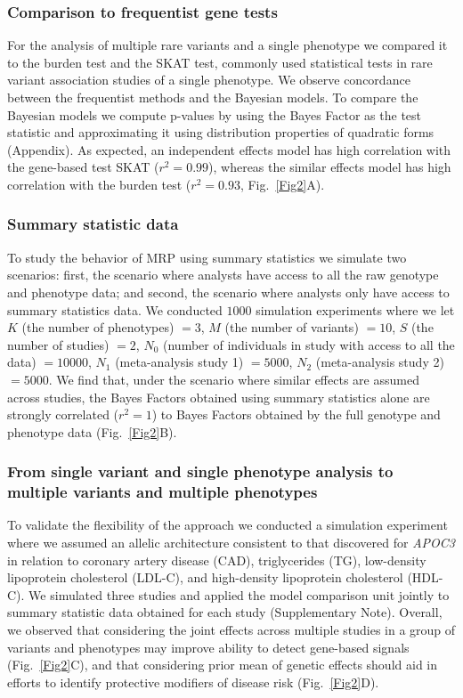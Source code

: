 \documentclass{nature}
\begin{document}
\subsubsection{Comparison to frequentist gene tests}
For the analysis of multiple rare variants and a single phenotype we compared it to the burden test and the SKAT test, commonly used statistical tests in rare variant association studies of a single phenotype. We observe concordance between the frequentist methods and the Bayesian models. To compare the Bayesian models we compute p-values by using the Bayes Factor as the test statistic and approximating it using distribution properties of quadratic forms (Appendix). As expected, an independent effects model has high correlation with the gene-based test SKAT ($r^2 = 0.99$), whereas the similar effects model has high correlation with the burden test ($r^2 = 0.93$, Fig.~\ref{Fig2}A). 

\subsubsection{Summary statistic data}
To study the behavior of MRP using summary statistics we simulate two scenarios: first, the scenario where analysts have access to all the raw genotype and phenotype data; and second, the scenario where analysts only have access to summary statistics data\cite{liu2014meta}. We conducted $1000$ simulation experiments where we let $K$ (the number of phenotypes) $=3$, $M$ (the number of variants) $=10$, $S$ (the number of studies) $=2$, $N_0$ (number of individuals in study with access to all the data) $= 10000$, $N_1$ (meta-analysis study 1) $= 5000$, $N_2$ (meta-analysis study 2) $= 5000$. We find that, under the scenario where similar effects are assumed across studies, the Bayes Factors obtained using summary statistics alone are strongly correlated ($r^2 = 1$) to Bayes Factors obtained by the full genotype and phenotype data (Fig.~\ref{Fig2}B).

\subsubsection{From single variant and single phenotype analysis to multiple variants and multiple phenotypes}
To validate the flexibility of the approach we conducted a simulation experiment where we assumed an allelic architecture consistent to that discovered for {\it APOC3} in relation to coronary artery disease (CAD), triglycerides (TG), low-density lipoprotein cholesterol (LDL-C), and high-density lipoprotein cholesterol (HDL-C)\cite{apoc3,apoc32,jorgensen2014loss,cohorts2014loss}. We simulated three studies and applied the model comparison unit jointly to summary statistic data obtained for each study (Supplementary Note). Overall, we observed that considering the joint effects across multiple studies in a group of variants and phenotypes may improve ability to detect gene-based signals (Fig.~\ref{Fig2}C), and that considering prior mean of genetic effects should aid in efforts to identify protective modifiers of disease risk (Fig.~\ref{Fig2}D).
\end{document}
